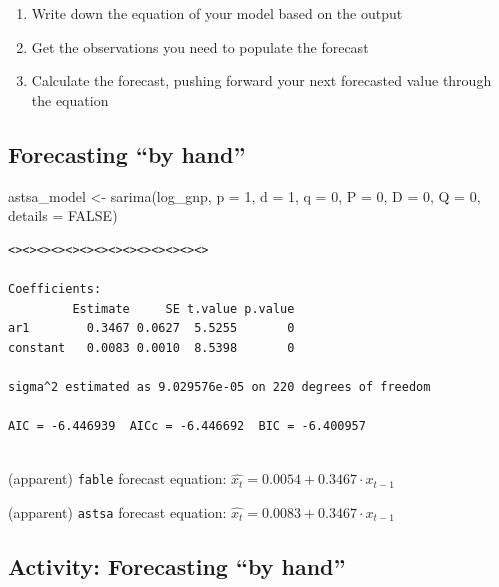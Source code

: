 \documentclass[
  letterpaper,
  DIV=11,
  numbers=noendperiod]{scrartcl}
\newenvironment{Shaded}{\begin{snugshade}}{\end{snugshade}}
\newcommand{\AttributeTok}[1]{\textcolor[rgb]{0.40,0.45,0.13}{#1}}
\newcommand{\ConstantTok}[1]{\textcolor[rgb]{0.56,0.35,0.01}{#1}}
\newcommand{\DecValTok}[1]{\textcolor[rgb]{0.68,0.00,0.00}{#1}}
\newcommand{\FunctionTok}[1]{\textcolor[rgb]{0.28,0.35,0.67}{#1}}
\newcommand{\NormalTok}[1]{\textcolor[rgb]{0.00,0.23,0.31}{#1}}
\newcommand{\OtherTok}[1]{\textcolor[rgb]{0.00,0.23,0.31}{#1}}
\providecommand{\tightlist}{%
  \setlength{\itemsep}{0pt}\setlength{\parskip}{0pt}}\usepackage{longtable,booktabs,array}
\begin{document}
\begin{enumerate}
\def\labelenumi{\arabic{enumi}.}
\tightlist
\item
  Write down the equation of your model based on the output
\item
  Get the observations you need to populate the forecast
\item
  Calculate the forecast, pushing forward your next forecasted value
  through the equation
\end{enumerate}

\subsection{Forecasting ``by hand''}\label{forecasting-by-hand-1}

\begin{Shaded}
\begin{Highlighting}[]
\NormalTok{astsa\_model }\OtherTok{\textless{}{-}} \FunctionTok{sarima}\NormalTok{(log\_gnp, }\AttributeTok{p =} \DecValTok{1}\NormalTok{, }\AttributeTok{d =} \DecValTok{1}\NormalTok{, }\AttributeTok{q =} \DecValTok{0}\NormalTok{, }\AttributeTok{P =} \DecValTok{0}\NormalTok{, }\AttributeTok{D =} \DecValTok{0}\NormalTok{, }\AttributeTok{Q =} \DecValTok{0}\NormalTok{, }\AttributeTok{details =} \ConstantTok{FALSE}\NormalTok{)}
\end{Highlighting}
\end{Shaded}

\begin{verbatim}
<><><><><><><><><><><><><><>
 
Coefficients: 
         Estimate     SE t.value p.value
ar1        0.3467 0.0627  5.5255       0
constant   0.0083 0.0010  8.5398       0

sigma^2 estimated as 9.029576e-05 on 220 degrees of freedom 
 
AIC = -6.446939  AICc = -6.446692  BIC = -6.400957 
 
\end{verbatim}

(apparent) \texttt{fable} forecast equation:
\(\hat{x_t} = 0.0054 + 0.3467\cdot x_{t-1}\)

(apparent) \texttt{astsa} forecast equation:
\(\hat{x_t} = 0.0083 + 0.3467\cdot x_{t-1}\)

\subsection{Activity: Forecasting ``by
hand''}\label{activity-forecasting-by-hand}
\end{document}
